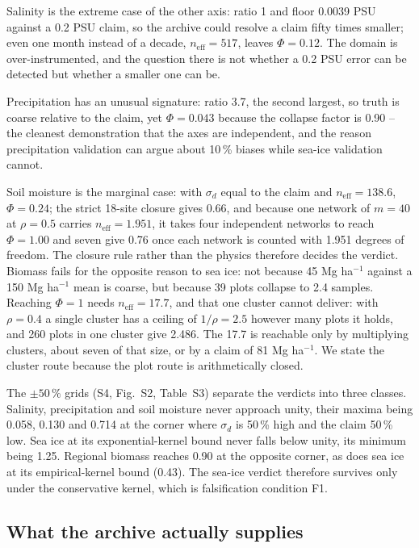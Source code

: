 \documentclass[preprint,12pt,authoryear]{elsarticle}
\begin{document}
Salinity is the extreme case of the other axis: ratio 1 and floor 0.0039 PSU against a 0.2 PSU claim, so the archive could resolve a claim fifty times smaller; even one month instead of a decade, $n_{\mathrm{eff}} = 517$, leaves $\Phi = 0.12$. The domain is over-instrumented, and the question there is not whether a 0.2 PSU error can be detected but whether a smaller one can be.

Precipitation has an unusual signature: ratio 3.7, the second largest, so truth is coarse relative to the claim, yet $\Phi = 0.043$ because the collapse factor is 0.90 -- the cleanest demonstration that the axes are independent, and the reason precipitation validation can argue about 10\,\% biases \citep{beck2019daily,li2018evaluation,beck2017global} while sea-ice validation cannot.

Soil moisture is the marginal case: with $\sigma_d$ equal to the claim and $n_{\mathrm{eff}} = 138.6$, $\Phi = 0.24$; the strict 18-site closure gives 0.66, and because one network of $m=40$ at
$\rho=0.5$ carries $n_{\mathrm{eff}} = 1.951$, it takes four independent networks to
reach $\Phi = 1.00$ and seven give 0.76 once each network is counted with 1.951
degrees of freedom. The closure rule rather than the physics therefore decides the verdict. Biomass fails for
the opposite reason to sea ice: not because 45 Mg ha$^{-1}$ against a 150 Mg ha$^{-1}$
mean is coarse, but because 39 plots collapse to 2.4 samples. Reaching $\Phi = 1$
needs $n_{\mathrm{eff}} = 17.7$, and that one cluster cannot deliver: with
$\rho = 0.4$ a single cluster has a ceiling of $1/\rho = 2.5$ however many plots it
holds, and 260 plots in one cluster give 2.486. The 17.7 is reachable only by
multiplying clusters, about seven of that size, or by a claim of
81 Mg ha$^{-1}$. We state the cluster route because the plot route is arithmetically closed.

The $\pm 50\,\%$ grids (S4, Fig.~S2, Table~S3) separate the verdicts into three classes. Salinity, precipitation and soil moisture never approach unity, their maxima being 0.058, 0.130 and 0.714 at the corner where $\sigma_d$ is 50\,\% high and the claim 50\,\% low. Sea ice at its exponential-kernel bound never falls below unity, its minimum being 1.25. Regional biomass reaches 0.90 at the opposite corner, as does sea ice at its empirical-kernel bound (0.43). The sea-ice verdict therefore survives only under the conservative kernel, which is falsification condition F1.

\subsection{What the archive actually supplies}
\label{sec:archive}
\end{document}
